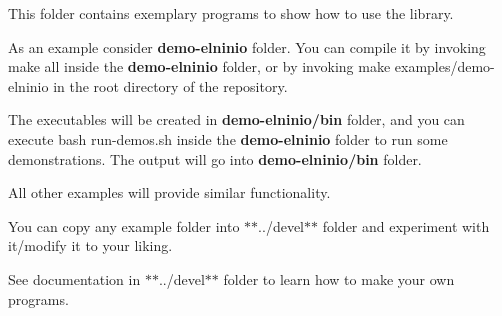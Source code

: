 This folder contains exemplary programs to show how to use the library.

As an example consider {\bfseries{demo-\/elninio}} folder. You can compile it by invoking {\ttfamily make all} inside the {\bfseries{demo-\/elninio}} folder, or by invoking {\ttfamily make examples/demo-\/elninio} in the root directory of the repository.

The executables will be created in {\bfseries{demo-\/elninio/bin}} folder, and you can execute {\ttfamily bash run-\/demos.\+sh} inside the {\bfseries{demo-\/elninio}} folder to run some demonstrations. The output will go into {\bfseries{demo-\/elninio/bin}} folder.

All other examples will provide similar functionality.

You can copy any example folder into $\ast$$\ast$../devel$\ast$$\ast$ folder and experiment with it/modify it to your liking.

See documentation in $\ast$$\ast$../devel$\ast$$\ast$ folder to learn how to make your own programs. 